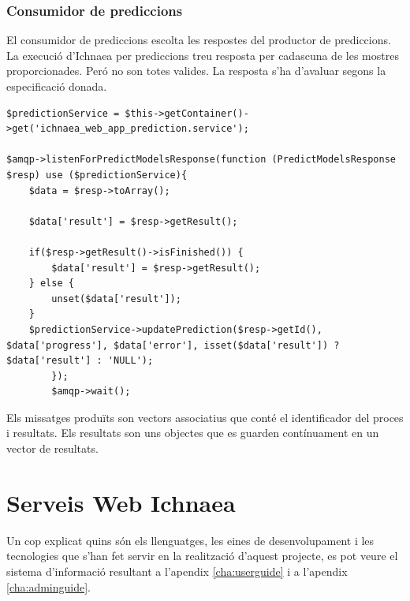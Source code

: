 \subsubsection{Consumidor de prediccions}
El consumidor de prediccions escolta les respostes del productor de prediccions.\\

La execució d'Ichnaea per prediccions treu resposta per cadascuna de les mostres proporcionades. Peró no son totes valides. La resposta s'ha d'avaluar segons la especificació donada. 
\begin{lstlisting}
$predictionService = $this->getContainer()->get('ichnaea_web_app_prediction.service');
		
$amqp->listenForPredictModelsResponse(function (PredictModelsResponse $resp) use ($predictionService){
	$data = $resp->toArray();
	
	$data['result'] = $resp->getResult();

	if($resp->getResult()->isFinished()) {
 		$data['result'] = $resp->getResult();
	} else {
		unset($data['result']);
	}
	$predictionService->updatePrediction($resp->getId(), $data['progress'], $data['error'], isset($data['result']) ? $data['result'] : 'NULL');
		});
		$amqp->wait();
\end{lstlisting}

Els missatges produïts son vectors associatius que cont\'{e} el identificador del proces i resultats. Els resultats son uns objectes que es guarden contínuament en un vector de resultats.


\section{Serveis Web Ichnaea}
Un cop explicat quins són els llenguatges, les eines de desenvolupament i les tecnologies que s’han fet servir en la realització d’aquest projecte, es pot veure el sistema d’informació resultant a l'apendix \ref{cha:userguide}
i a l'apendix \ref{cha:adminguide}.\\ 
 